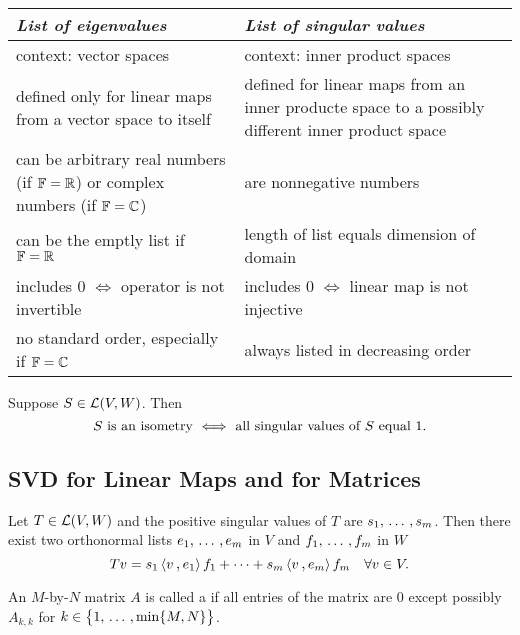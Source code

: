 \begin{tabular}{|p{}|p{}|}
  \hline
  \emph{List of eigenvalues} & \emph{List of singular values} \\
  \hline
  context: vector spaces & context: inner product spaces \\
  \hline
  defined only for linear maps from a vector space to itself & defined for linear maps from an inner producte space to a possibly different inner product space \\
  \hline
  can be arbitrary real numbers (if $\mathbb{F} = \mathbb{R}$) or complex numbers (if $\mathbb{F}=\mathbb{C}$) & are nonnegative numbers \\
  \hline
  can be the emptly list if $\mathbb{F} = \mathbb{R}$ & length of list equals dimension of domain \\
  \hline
  includes $0$ $\iff$ operator is not invertible & includes $0$ $\iff$ linear map is not injective \\
  \hline
  no standard order, especially if $\mathbb{F} = \mathbb{C}$ & always listed in decreasing order \\
  \hline
\end{tabular}

\begin{thm}
  \label{thm: isometries characterized by having all singular a values equal 1}
  Suppose $S \in \mathcal{L} (V,W)$. Then
  \[
    S$ is an isometry $ \iff $ all singular values of $S$ equal $1.
  \]
\end{thm}

\subsection{SVD for Linear Maps and for Matrices}

\begin{thm}
  Let $T\in \mathcal{L} (V,W)$ and the positive singular values of $T$ are $s_1, {\, \ldots \,\,}, s_m$. Then there exist two orthonormal lists $e_1, {\, \ldots \,\,}, e_m$ in $V$ and $f_1, {\, \ldots \,\,}, f_m$ in $W$ \st
  \[
    Tv = s_1 \ip{v}{e_1} f_1 + \cdots + s_m \ip{v}{e_m}f_m \quad \forall v \in V.
  \]
\end{thm}

\begin{mydef}
  An $M$-by-$N$ matrix $A$ is called a  if all entries of the matrix are $0$ except possibly $A_{k,k}$ for $k \in \big\{1, {\, \ldots \,\,}, \operatorname{min} \{M,N\} \big \}$.
\end{mydef}

